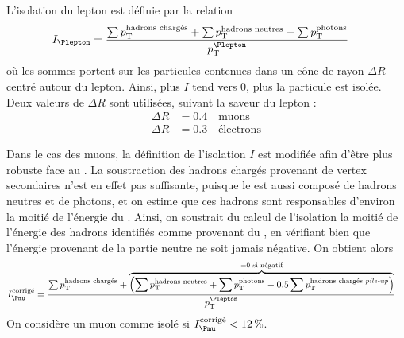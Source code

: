 L'isolation du lepton est définie par la relation
\begin{align*}
  I_{\Plepton} &= \frac{\sum{\pt^\text{hadrons chargés}} + \sum{\pt^\text{hadrons neutres}} + \sum{\pt^\text{photons}}}{\pt^{\Plepton}}
\end{align*}
où les sommes portent sur les particules contenues dans un cône de rayon $\Delta R$ centré autour du lepton. Ainsi, plus $I$ tend vers 0, plus la particule est isolée. Deux valeurs de $\Delta R$ sont utilisées, suivant la saveur du lepton :
\begin{align*}
  \Delta R &= \num{0.4} \quad\text{muons}\\
  \Delta R &= \num{0.3} \quad\text{électrons}
\end{align*}

Dans le cas des muons, la définition de l'isolation $I$ est modifiée afin d'être plus robuste face au \pu. La soustraction des hadrons chargés provenant de vertex secondaires n'est en effet pas suffisante, puisque le \pu est aussi composé de hadrons neutres et de photons, et on estime que ces hadrons sont responsables d'environ la moitié de l'énergie du \pu. Ainsi, on soustrait du calcul de l'isolation la moitié de l'énergie des hadrons identifiés comme provenant du \pu, en vérifiant bien que l'énergie provenant de la partie neutre ne soit jamais négative. On obtient alors
\begin{align*}
  I_{\Pmu}^\text{corrigé} &= \frac{\sum{\pt^\text{hadrons chargés}} + \overbrace{\left(\sum{\pt^\text{hadrons neutres}} + \sum{\pt^\text{photons}} - \num{0.5} \sum{\pt^\text{hadrons chargés \pu}} \right)}^{= 0 \text{ si négatif}}}{\pt^{\Plepton}}
\end{align*}
On considère un muon comme isolé si $I_{\Pmu}^\text{corrigé} < \SI{12}{\%}$.

\smallskip

